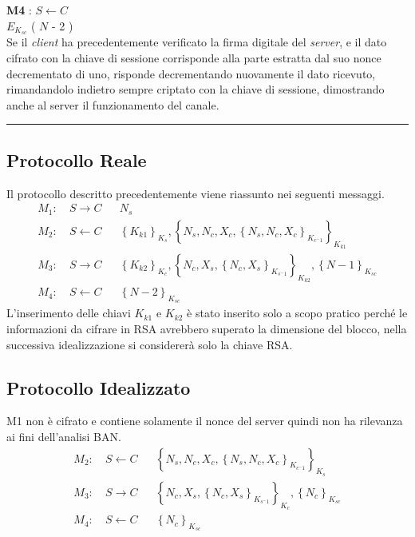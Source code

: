 \documentclass[a4paper,titlepage]{article}
\newcommand{\encrypt}[2]{\left\{#1\right\}_{#2}}
\begin{document}
\begin{center}
\textbf{M4} : $S \leftarrow C$ \\ $E_{K_{sc}}$ ( $N$ - 2 ) \\[0.3cm]
Se il \textit{client} ha precedentemente verificato la firma digitale del \textit{server}, e il dato cifrato con la chiave di sessione corrisponde alla parte estratta dal suo nonce decrementato di uno, risponde decrementando nuovamente il dato ricevuto, rimandandolo indietro sempre criptato con la chiave di sessione, dimostrando anche al server il funzionamento del canale. \\
\rule{6cm}{0.4pt}
\end{center}

\subsection{Protocollo Reale}
Il protocollo descritto precedentemente viene riassunto nei seguenti messaggi.
\[
\begin{aligned}
	M_1:\ & S \rightarrow C & &  N_s\\
	M_2:\ & S \leftarrow  C & &  \encrypt{K_{k1}}{K_{s}}, \encrypt{N_s, N_c, X_c, \encrypt{N_s, N_c, X_c}{K_{c^-1}} }{K_{k1}} \\
	M_3:\ & S \rightarrow  C & &  \encrypt{K_{k2}}{K_{c}}, \encrypt{N_c, X_s, \encrypt{N_c, X_s}{K_{s^-1}}}{K_{k2}},  \encrypt{N-1}{K_{sc}}\\
	M_4:\ & S \leftarrow  C & & \encrypt{N-2}{K_{sc}}
\end{aligned}
\]
L'inserimento delle chiavi $K_{k1}$ e $K_{k2}$ è stato inserito solo a scopo pratico perché le informazioni da cifrare in RSA avrebbero superato la dimensione del blocco, nella successiva idealizzazione si considererà solo la chiave RSA.

\subsection{Protocollo Idealizzato}
M1 non è cifrato e contiene solamente il nonce del server quindi non ha rilevanza ai fini dell'analisi BAN.
\[
\begin{aligned}
	M_2:\ & S \leftarrow  C & &  \encrypt{N_s, N_c, X_c, \encrypt{N_s, N_c, X_c}{K_{c^-1}} }{K_{s}} \\
	M_3:\ & S \rightarrow  C & &  \encrypt{N_c, X_s, \encrypt{N_c, X_s}{K_{s^-1}}} {K_{c}},  \encrypt{N_c}{K_{sc}}\\
	M_4:\ & S \leftarrow  C & & \encrypt{N_c}{K_{sc}}
\end{aligned}
\]
\end{document}
